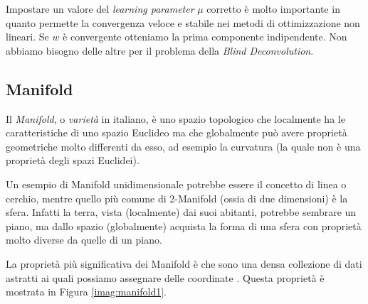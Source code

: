 \documentclass[final]{siamltex}
\begin{document}
Impostare un valore del \textit{learning parameter} $\mu$ corretto \`{e} molto importante in quanto permette la convergenza veloce e stabile nei metodi di ottimizzazione non lineari. Se $w$ \`{e} convergente otteniamo la prima componente indipendente. Non abbiamo bisogno delle altre per il problema della \textit{Blind Deconvolution}.
%
%
\subsection{Manifold}\label{sec7}
%
Il \textit{Manifold}, o \textit{variet\`{a}} in italiano, \`{e} uno spazio topologico che localmente ha le caratteristiche di uno spazio Euclideo ma che globalmente pu\`{o} avere propriet\`{a} geometriche molto differenti da esso, ad esempio la curvatura (la quale non \`{e} una propriet\`{a} degli spazi Euclidei).

Un esempio di Manifold unidimensionale potrebbe essere il concetto di linea o cerchio, mentre quello pi\`{u} comune di 2-Manifold (ossia di due dimensioni) \`{e} la sfera. Infatti la terra, vista (localmente) dai suoi abitanti, potrebbe sembrare un piano, ma dallo spazio (globalmente) acquista la forma di una sfera con propriet\`{a} molto diverse da quelle di un piano.  

La propriet\`{a} pi\`{u} significativa dei Manifold  \`{e} che sono una densa collezione di dati astratti ai quali possiamo assegnare delle coordinate \cite{slidefiori}. Questa propriet\`{a} \`{e} mostrata in Figura \ref{imag:manifold1}.\\
\end{document}
